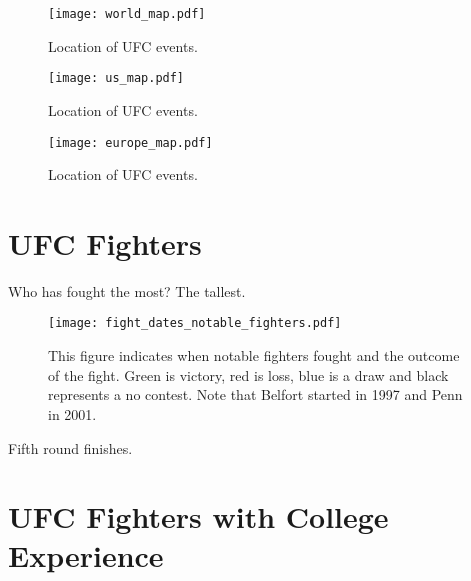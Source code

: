 \documentclass[12pt]{article}
\begin{document}
\begin{figure}[h]
\begin{center}
\texttt{[image: world\_map.pdf]}
\caption{Location of UFC events.}
\end{center}
\end{figure}

\begin{figure}[h]
\begin{center}
\texttt{[image: us\_map.pdf]}
\caption{Location of UFC events.}
\end{center}
\end{figure}

\begin{figure}[h]
\begin{center}
\texttt{[image: europe\_map.pdf]}
\caption{Location of UFC events.}
\end{center}
\end{figure}

\section*{UFC Fighters}

Who has fought the most? The tallest.

\begin{figure}[h]
\begin{center}
\texttt{[image: fight\_dates\_notable\_fighters.pdf]}
\caption{This figure indicates when notable fighters fought and the outcome of the fight. Green is victory, red is loss, blue is a draw
and black represents a no contest. Note that Belfort started in 1997 and Penn in 2001.}
\end{center}
\end{figure}








Fifth round finishes.
\appendix


\section{UFC Fighters with College Experience}
\label{appendix_education}
\begin{center}

\end{center}

%
\end{document}
